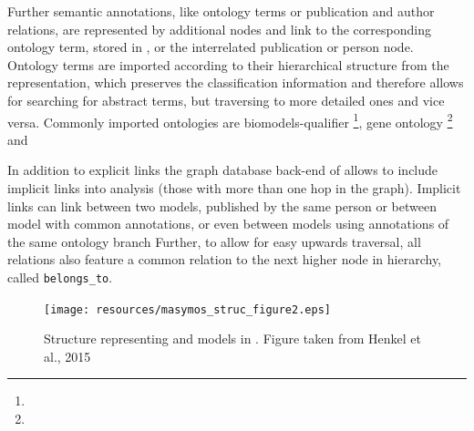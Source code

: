 Further semantic annotations, like ontology terms or publication and author relations, are represented by additional nodes and link to the corresponding ontology term, stored in \neoj, or the interrelated publication or person node. 
Ontology terms are imported according to their hierarchical structure from the \owl representation, which preserves the classification information and therefore allows for searching for abstract terms, but traversing to more detailed ones and vice versa.
Commonly imported ontologies are biomodels-qualifier \footnote{}, gene ontology \footnote{} and 

In addition to explicit links the graph database back-end of \masymos allows to include implicit links into analysis (those with more than one hop in the graph). Implicit links can link between two models, published by the same person or between model with common annotations, or even between models using annotations of the same ontology branch
Further, to allow for easy upwards traversal, all relations also feature a common relation to the next higher node in hierarchy, called \texttt{belongs\_to}.

\begin{figure}
	\centering
	\texttt{[image: resources/masymos\_struc\_figure2.eps]}
	\caption{Structure representing \sbml and \cellml models in \masymos. Figure taken from Henkel et al., 2015 \cite{Henkel2015}}
	\label{fig:background:graph-db:masymos}
\end{figure}

